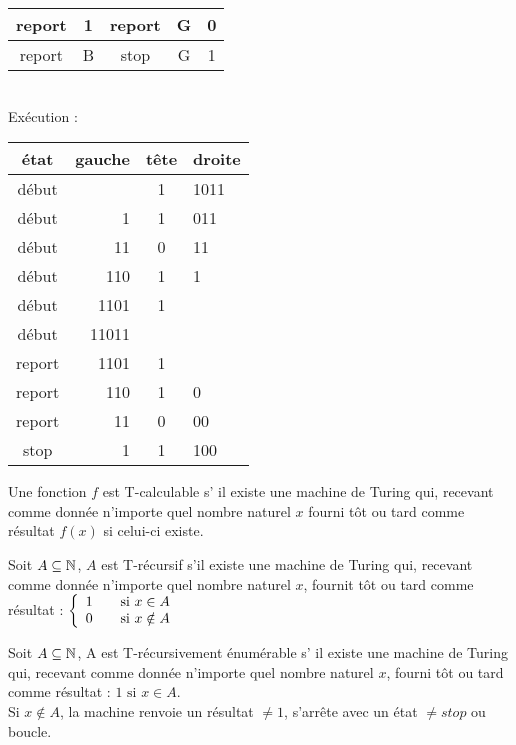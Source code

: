 \begin{myexem}
\begin{tabular}{|c|c|c|c|c|}
 report & 1 & report & G & 0 \\ \hline
 report & B & stop & G & 1 \\ \hline
\end{tabular}
\vspace{4pt}
\\
Exécution : \\
\begin{tabular}{|c|r|c|l|}
\hline
 état & gauche & tête & droite \\\hline
 début &  & 1 & 1011 \\ \hline
 début & 1 & 1 & 011 \\ \hline
 début & 11 & 0 & 11 \\ \hline
 début & 110 & 1 & 1 \\ \hline
 début & 1101 & 1 & \\ \hline
 début & 11011 &  & \\ \hline
 report & 1101 & 1 & \\ \hline
 report & 110 & 1 & 0 \\ \hline
 report & 11 & 0 & 00 \\ \hline
 stop & 1 & 1 & 100 \\ \hline
\end{tabular}

\end{myexem}
\begin{mydef}[T-calculable] Une fonction $f$ est T-calculable s’ il existe une machine
de Turing qui,
	recevant comme donnée n'importe quel nombre naturel $x$ fourni tôt ou tard
	comme résultat $f(x)$ si celui-ci existe.
\end{mydef}

\begin{mydef}[T-récursif] Soit $A\subseteq \mathbb{N}$, $A$ est T-récursif s’il existe
	une machine de Turing qui, recevant comme donnée n'importe quel nombre
	naturel $x$, fournit tôt ou tard comme résultat :
	$ \left\{
		\begin{array}{l l}
			1 & \quad \text{si $x\in A$}\\
    		0 & \quad \text{si $x\notin A$}
		\end{array} \right.$
\end{mydef}

\begin{mydef} Soit $A\subseteq \mathbb{N}$, A est
	T-récursivement énumérable s’ il existe
	une machine de Turing qui, recevant comme donnée n'importe quel nombre
	naturel $x$, fourni tôt ou tard comme résultat : $ 1 \text{ si } x \in A$.\\
	Si $x \notin A$, la machine renvoie un résultat $\neq 1$, s'arrête avec un
	état $\neq stop$ ou boucle.
\end{mydef}

